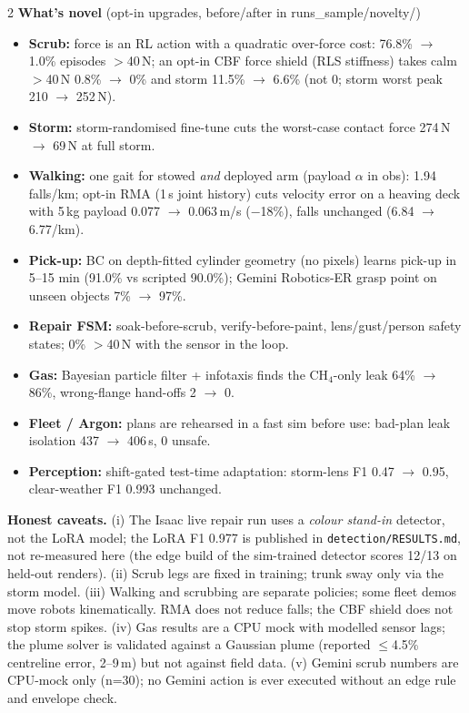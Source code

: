 \documentclass[8pt,a4paper]{extarticle}
\newcommand{\fn}[1]{{\fontsize{5.6}{6.4}\selectfont\ttfamily #1}}
\newcommand{\hd}[1]{\textbf{\textcolor{edge}{#1}}}
\begin{document}
\begin{multicols}{2}
\hd{What's novel} {\scriptsize(opt-in upgrades, before/after in \fn{runs\_sample/novelty/})}\par
{\scriptsize\begin{itemize}[label=--]
\item \textbf{Scrub:} force is an RL action with a quadratic over-force cost: 76.8\% $\to$ 1.0\% episodes $>$40\,N; an opt-in CBF force shield (RLS stiffness) takes calm $>$40\,N 0.8\% $\to$ 0\% and storm 11.5\% $\to$ 6.6\% (not 0; storm worst peak 210 $\to$ 252\,N).
\item \textbf{Storm:} storm-randomised fine-tune cuts the worst-case contact force 274\,N $\to$ 69\,N at full storm.
\item \textbf{Walking:} one gait for stowed \emph{and} deployed arm (payload $\alpha$ in obs): 1.94 falls/km; opt-in RMA (1\,s joint history) cuts velocity error on a heaving deck with 5\,kg payload 0.077 $\to$ 0.063\,m/s ($-$18\%), falls unchanged (6.84 $\to$ 6.77/km).
\item \textbf{Pick-up:} BC on depth-fitted cylinder geometry (no pixels) learns pick-up in 5--15 min (91.0\% vs scripted 90.0\%); Gemini Robotics-ER grasp point on unseen objects 7\% $\to$ 97\%.
\item \textbf{Repair FSM:} soak-before-scrub, verify-before-paint, lens/gust/person safety states; 0\% $>$40\,N with the sensor in the loop.
\item \textbf{Gas:} Bayesian particle filter + infotaxis finds the CH$_4$-only leak 64\% $\to$ 86\%, wrong-flange hand-offs 2 $\to$ 0.
\item \textbf{Fleet / Argon:} plans are rehearsed in a fast sim before use: bad-plan leak isolation 437 $\to$ 406\,s, 0 unsafe.
\item \textbf{Perception:} shift-gated test-time adaptation: storm-lens F1 0.47 $\to$ 0.95, clear-weather F1 0.993 unchanged.
\end{itemize}}

\hd{Honest caveats.} (i) The Isaac live repair run uses a \emph{colour stand-in} detector, not the LoRA model; the LoRA
F1 0.977 is published in \texttt{detection/RESULTS.md}, not re-measured here (the edge build of the sim-trained detector
scores 12/13 on held-out renders). (ii) Scrub legs are fixed in training; trunk sway only via the storm model. (iii) Walking and scrubbing are separate policies; some fleet demos move robots
kinematically. RMA does not reduce falls; the CBF shield does not stop storm spikes. (iv) Gas results are a CPU mock with modelled sensor lags; the plume solver is validated against a
Gaussian plume (reported $\leq$4.5\% centreline error, 2--9\,m) but not against field data. (v) Gemini scrub numbers are
CPU-mock only (n=30); no Gemini action is ever executed without an edge rule and envelope check.
\end{multicols}
\end{document}
